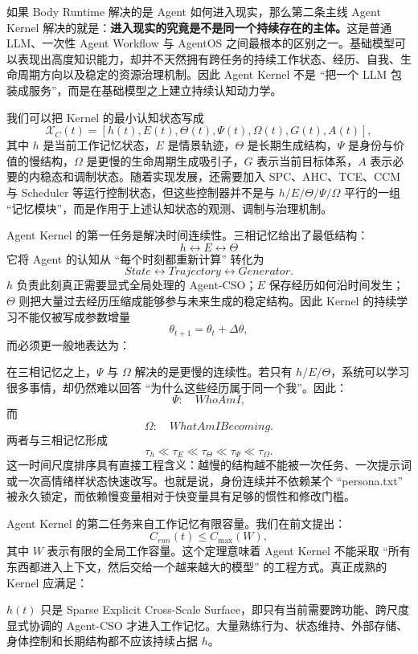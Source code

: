 如果 Body Runtime 解决的是 Agent 如何进入现实，那么第二条主线 Agent Kernel 解决的就是：\textbf{进入现实的究竟是不是同一个持续存在的主体。}这是普通 LLM、一次性 Agent Workflow 与 AgentOS 之间最根本的区别之一。基础模型可以表现出高度知识能力，却并不天然拥有跨任务的持续工作状态、经历、自我、生命周期方向以及稳定的资源治理机制。因此 Agent Kernel 不是 ``把一个 LLM 包装成服务''，而是在基础模型之上建立持续认知动力学。

我们可以把 Kernel 的最小认知状态写成
\[
\mathcal X_C(t)
=
\left[
h(t),
E(t),
\Theta(t),
\Psi(t),
\Omega(t),
G(t),
A(t)
\right],
\]
其中 $h$ 是当前工作记忆状态，$E$ 是情景轨迹，$\Theta$ 是长期生成结构，$\Psi$ 是身份与价值的慢结构，$\Omega$ 是更慢的生命周期生成吸引子，$G$ 表示当前目标体系，$A$ 表示必要的内稳态和调制状态。随着实现发展，还需要加入 SPC、AHC、TCE、CCM 与 Scheduler 等运行控制状态，但这些控制器并不是与 $h/E/\Theta/\Psi/\Omega$ 平行的一组 ``记忆模块''，而是作用于上述认知状态的观测、调制与治理机制。

Agent Kernel 的第一任务是解决时间连续性。三相记忆给出了最低结构：
\[
\boxed{
h \leftrightarrow E \leftrightarrow \Theta
}
\]
它将 Agent 的认知从 ``每个时刻都重新计算'' 转化为
\[
State
\leftrightarrow
Trajectory
\leftrightarrow
Generator.
\]
$h$ 负责此刻真正需要显式全局处理的 Agent-CSO；$E$ 保存经历如何沿时间发生；$\Theta$ 则把大量过去经历压缩成能够参与未来生成的稳定结构。因此 Kernel 的持续学习不能仅被写成参数增量
\[
\theta_{t+1}=\theta_t+\Delta\theta,
\]
而必须更一般地表达为：
\begin{statementbox}
\centering
{}
\end{statementbox}

在三相记忆之上，$\Psi$ 与 $\Omega$ 解决的是更慢的连续性。若只有 $h/E/\Theta$，系统可以学习很多事情，却仍然难以回答 ``为什么这些经历属于同一个我''。因此：
\[
\Psi:\quad WhoAmI,
\]
而
\[
\Omega:\quad WhatAmIBecoming.
\]
两者与三相记忆形成
\[
\tau_h
\ll
\tau_E
\ll
\tau_\Theta
\ll
\tau_\Psi
\ll
\tau_\Omega .
\]
这一时间尺度排序具有直接工程含义：越慢的结构越不能被一次任务、一次提示词或一次高情绪样状态快速改写。也就是说，身份连续并不依赖某个 ``persona.txt'' 被永久锁定，而依赖慢变量相对于快变量具有足够的惯性和修改门槛。

Agent Kernel 的第二任务来自工作记忆有限容量。我们在前文提出：
\[
C_{run}(t)\leq C_{\max}(W),
\]
其中 $W$ 表示有限的全局工作容量。这个定理意味着 Agent Kernel 不能采取 ``所有东西都进入上下文，然后交给一个越来越大的模型'' 的工程方式。真正成熟的 Kernel 应满足：
\begin{statementbox}
\centering
{}
\end{statementbox}
$h(t)$ 只是 Sparse Explicit Cross-Scale Surface，即只有当前需要跨功能、跨尺度显式协调的 Agent-CSO 才进入工作记忆。大量熟练行为、状态维持、外部存储、身体控制和长期结构都不应该持续占据 $h$。

